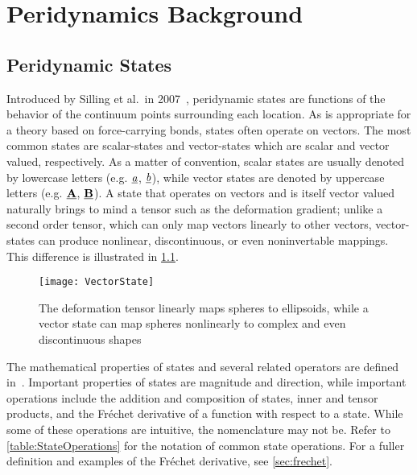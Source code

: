\chapter{Peridynamics Background}

\section{Peridynamic States}
%
Introduced by Silling et al.\ in 2007~\cite{silling2007peridynamic}, peridynamic states are functions of the behavior of the continuum points surrounding each location.
As is appropriate for a theory based on force-carrying bonds, states often operate on vectors.
The most common states are scalar-states and vector-states which are scalar and vector valued, respectively.
As a matter of convention, scalar states are usually denoted by lowercase letters (e.g. $\sstate{a}{}{}$, $\sstate{b}{}{}$), while vector states are denoted by uppercase letters (e.g. $\vstate{A}{}{}$, $\vstate{B}{}{}$).
A state that operates on vectors and is itself vector valued naturally brings to mind a tensor such as the deformation gradient;
unlike a second order tensor, which can only map vectors linearly to other vectors, vector-states can produce nonlinear, discontinuous, or even noninvertable mappings.  
This difference is illustrated in \cref{fig:VectorState}.
%
\begin{figure}[h]
  \centering
\texttt{[image: VectorState]}
\caption[Deformation tensor vs. deformation vector state]{The deformation tensor linearly maps spheres to ellipsoids, while a vector state can map spheres nonlinearly to complex and even discontinuous shapes \cite{silling2007peridynamic}}
\label{fig:VectorState}
\end{figure}
%

The mathematical properties of states and several related operators are defined in~\cite{silling2007peridynamic}.
Important properties of states are magnitude and direction, while important operations include the addition and composition of states, inner and tensor products, and the Fr\'{e}chet derivative of a function with respect to a state.
While some of these operations are intuitive, the nomenclature may not be.
Refer to \cref{table:StateOperations} for the notation of common state operations.
For a fuller definition and examples of the Fr\'echet derivative, see \cref{sec:frechet}.

